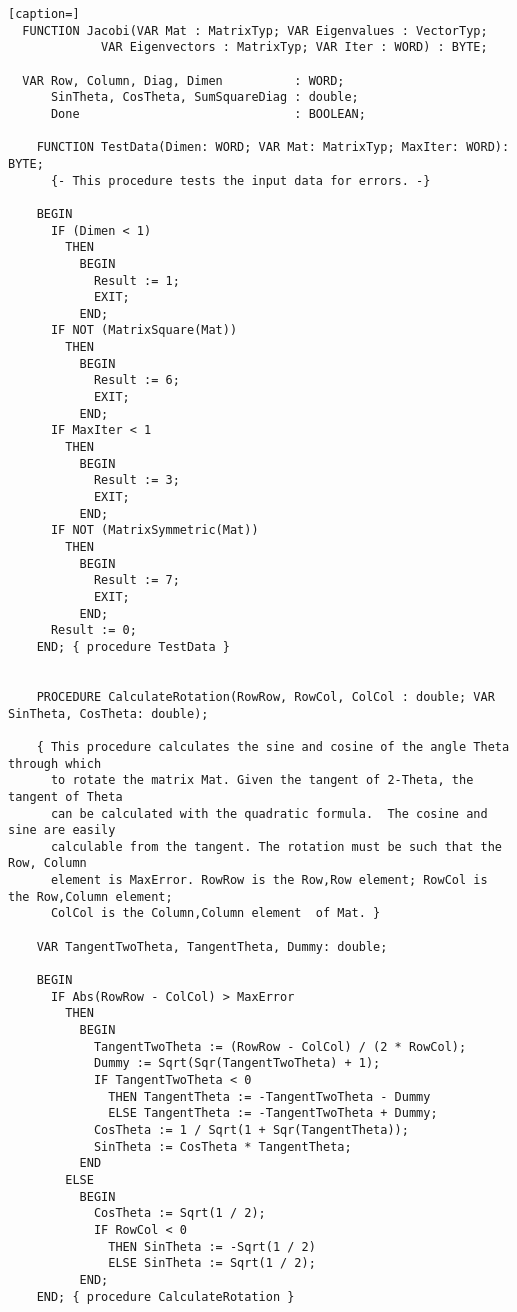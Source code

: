 \begin{lstlisting}[caption=]
  FUNCTION Jacobi(VAR Mat : MatrixTyp; VAR Eigenvalues : VectorTyp;
             VAR Eigenvectors : MatrixTyp; VAR Iter : WORD) : BYTE;

  VAR Row, Column, Diag, Dimen          : WORD;
      SinTheta, CosTheta, SumSquareDiag : double;
      Done                              : BOOLEAN;

    FUNCTION TestData(Dimen: WORD; VAR Mat: MatrixTyp; MaxIter: WORD): BYTE;
      {- This procedure tests the input data for errors. -}

    BEGIN
      IF (Dimen < 1)
        THEN
          BEGIN
            Result := 1;
            EXIT;
          END;
      IF NOT (MatrixSquare(Mat))
        THEN
          BEGIN
            Result := 6;
            EXIT;
          END;
      IF MaxIter < 1
        THEN
          BEGIN
            Result := 3;
            EXIT;
          END;
      IF NOT (MatrixSymmetric(Mat))
        THEN
          BEGIN
            Result := 7;
            EXIT;
          END;
      Result := 0;
    END; { procedure TestData }


    PROCEDURE CalculateRotation(RowRow, RowCol, ColCol : double; VAR SinTheta, CosTheta: double);

    { This procedure calculates the sine and cosine of the angle Theta through which
      to rotate the matrix Mat. Given the tangent of 2-Theta, the tangent of Theta
      can be calculated with the quadratic formula.  The cosine and sine are easily
      calculable from the tangent. The rotation must be such that the Row, Column
      element is MaxError. RowRow is the Row,Row element; RowCol is the Row,Column element;
      ColCol is the Column,Column element  of Mat. }

    VAR TangentTwoTheta, TangentTheta, Dummy: double;

    BEGIN
      IF Abs(RowRow - ColCol) > MaxError
        THEN
          BEGIN
            TangentTwoTheta := (RowRow - ColCol) / (2 * RowCol);
            Dummy := Sqrt(Sqr(TangentTwoTheta) + 1);
            IF TangentTwoTheta < 0
              THEN TangentTheta := -TangentTwoTheta - Dummy
              ELSE TangentTheta := -TangentTwoTheta + Dummy;
            CosTheta := 1 / Sqrt(1 + Sqr(TangentTheta));
            SinTheta := CosTheta * TangentTheta;
          END
        ELSE
          BEGIN
            CosTheta := Sqrt(1 / 2);
            IF RowCol < 0
              THEN SinTheta := -Sqrt(1 / 2)
              ELSE SinTheta := Sqrt(1 / 2);
          END;
    END; { procedure CalculateRotation }


\end{lstlisting}

